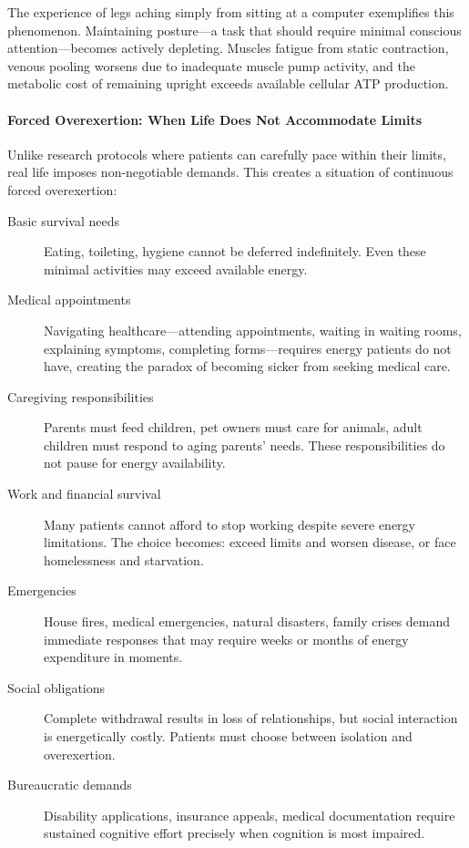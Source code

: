 The experience of legs aching simply from sitting at a computer exemplifies this phenomenon. Maintaining posture---a task that should require minimal conscious attention---becomes actively depleting. Muscles fatigue from static contraction, venous pooling worsens due to inadequate muscle pump activity, and the metabolic cost of remaining upright exceeds available cellular ATP production.

\paragraph{Forced Overexertion: When Life Does Not Accommodate Limits}

Unlike research protocols where patients can carefully pace within their limits, real life imposes non-negotiable demands. This creates a situation of continuous forced overexertion:

\begin{description}
    \item[Basic survival needs] Eating, toileting, hygiene cannot be deferred indefinitely. Even these minimal activities may exceed available energy.

    \item[Medical appointments] Navigating healthcare---attending appointments, waiting in waiting rooms, explaining symptoms, completing forms---requires energy patients do not have, creating the paradox of becoming sicker from seeking medical care.

    \item[Caregiving responsibilities] Parents must feed children, pet owners must care for animals, adult children must respond to aging parents' needs. These responsibilities do not pause for energy availability.

    \item[Work and financial survival] Many patients cannot afford to stop working despite severe energy limitations. The choice becomes: exceed limits and worsen disease, or face homelessness and starvation.

    \item[Emergencies] House fires, medical emergencies, natural disasters, family crises demand immediate responses that may require weeks or months of energy expenditure in moments.

    \item[Social obligations] Complete withdrawal results in loss of relationships, but social interaction is energetically costly. Patients must choose between isolation and overexertion.

    \item[Bureaucratic demands] Disability applications, insurance appeals, medical documentation require sustained cognitive effort precisely when cognition is most impaired.
\end{description}

